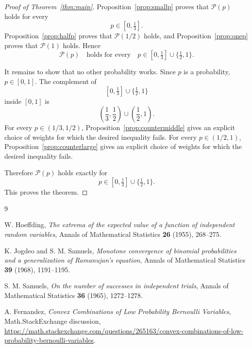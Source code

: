 \documentclass[12pt]{article}
\theoremstyle{definition}
\theoremstyle{plain}
\theoremstyle{remark}
\begin{document}
\begin{proof}[Proof of Theorem~\ref{thm:main}]
Proposition~\ref{prop:smallp} proves that \(\mathcal P(p)\) holds for every
\[
p\in[0,\tfrac13].
\]
Proposition~\ref{prop:halfp} proves that \(\mathcal P(1/2)\) holds, and Proposition~\ref{prop:onep} proves that \(\mathcal P(1)\) holds. Hence
\[
\mathcal P(p)\quad\text{holds for every}\quad
p\in[0,\tfrac13]\cup\{\tfrac12,1\}.
\]

It remains to show that no other probability works. Since \(p\) is a probability, \(p\in[0,1]\). The complement of
\[
[0,\tfrac13]\cup\{\tfrac12,1\}
\]
inside \([0,1]\) is
\[
\left(\frac13,\frac12\right)\cup\left(\frac12,1\right).
\]
For every \(p\in(1/3,1/2)\), Proposition~\ref{prop:countermiddle} gives an explicit choice of weights for which the desired inequality fails. For every \(p\in(1/2,1)\), Proposition~\ref{prop:counterlarge} gives an explicit choice of weights for which the desired inequality fails.

Therefore \(\mathcal P(p)\) holds exactly for
\[
p\in[0,\tfrac13]\cup\{\tfrac12,1\}.
\]
This proves the theorem.
\end{proof}

\begin{thebibliography}{9}

W. Hoeffding,
\emph{The extrema of the expected value of a function of independent random variables},
Annals of Mathematical Statistics \textbf{26} (1955), 268--275.

K. Jogdeo and S. M. Samuels,
\emph{Monotone convergence of binomial probabilities and a generalization of Ramanujan's equation},
Annals of Mathematical Statistics \textbf{39} (1968), 1191--1195.

S. M. Samuels,
\emph{On the number of successes in independent trials},
Annals of Mathematical Statistics \textbf{36} (1965), 1272--1278.

A. Fernandez,
\emph{Convex Combinations of Low Probability Bernoulli Variables},
Math.StackExchange discussion,
\url{https://math.stackexchange.com/questions/265163/convex-combinations-of-low-probability-bernoulli-variables}.

\end{thebibliography}
\end{document}
